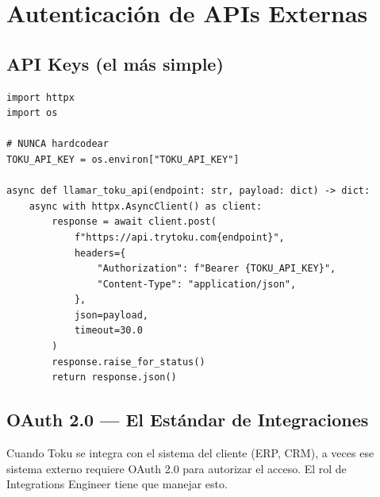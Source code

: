 \documentclass[11pt,a4paper]{article}
\begin{document}
\section{Autenticación de APIs Externas}

\subsection{API Keys (el más simple)}

\begin{lstlisting}[style=python]
import httpx
import os

# NUNCA hardcodear
TOKU_API_KEY = os.environ["TOKU_API_KEY"]

async def llamar_toku_api(endpoint: str, payload: dict) -> dict:
    async with httpx.AsyncClient() as client:
        response = await client.post(
            f"https://api.trytoku.com{endpoint}",
            headers={
                "Authorization": f"Bearer {TOKU_API_KEY}",
                "Content-Type": "application/json",
            },
            json=payload,
            timeout=30.0
        )
        response.raise_for_status()
        return response.json()
\end{lstlisting}

\subsection{OAuth 2.0 — El Estándar de Integraciones}

\begin{tcolorbox}[colback=hookpurple!5,colframe=hookpurple,title=\textbf{¿Cuándo aparece OAuth 2.0 en Toku?}]
Cuando Toku se integra con el sistema del cliente (ERP, CRM),
a veces ese sistema externo requiere OAuth 2.0 para autorizar el acceso.
El rol de Integrations Engineer tiene que manejar esto.
\end{tcolorbox}
\end{document}
